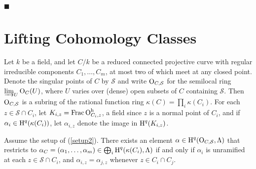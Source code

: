 \documentclass{amsart}
\theoremstyle{plain}
\theoremstyle{definition}
\theoremstyle{remark}
\numberwithin{equation}{section}%
\newcommand{\h}{{\text{\rm h}}}
\renewcommand{\H}{{\text{\rm H}}}
\renewcommand{\O}{{\text{\rm O}}}
\renewcommand{\S}{{\mathcal S}}
\newcommand{\Frac}{{\text{\rm Frac}\,}}
\begin{document}
\hfill $\blacksquare$


\section{Lifting Cohomology Classes}

\Paragraph\label{setup2}
Let $k$ be a field, and
let $C/k$ be a reduced connected projective curve with regular irreducible components $C_1,\dots,C_m$,
at most two of which meet at any closed point.
Denote the singular points of $C$ by $\S$
and write $\O_{C,\S}$ for the semilocal ring $\varinjlim_U\O_C(U)$,
where $U$ varies over (dense) open subsets of $C$ containing $\S$.
Then $\O_{C,\S}$ is a subring of the rational function ring $\kappa(C)=\prod_i \kappa(C_i)$.
For each $z\in \S\cap C_i$, let $K_{i,z}=\Frac\O_{C_i,z}^\h$, a field since $z$ is a normal point of
$C_i$, and if $\alpha_i\in\H^q(\kappa(C_i))$,
let $\alpha_{i,z}$ denote the image in $\H^q(K_{i,z})$.


\Lemma[Gluing]\label{gluing}
Assume the setup of (\ref{setup2}). 
There exists an element $\alpha\in\H^q(\O_{C,\S},\Lambda)$
that restricts to
$\alpha_C=(\alpha_1,\dots,\alpha_m)\in\bigoplus_i\H^q(\kappa(C_i),\Lambda)$
if and only if $\alpha_i$ is unramified at each $z\in\S\cap C_i$,
and $\alpha_{i,z}=\alpha_{j,z}$ whenever $z\in C_i\cap C_j$.
\rm
\end{document}
